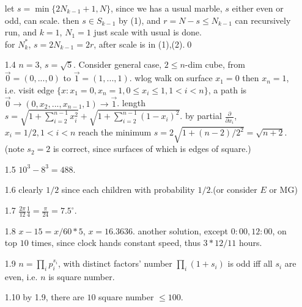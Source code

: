 \documentclass[paper=a4, fontsize=11pt]{scrartcl} %
\numberwithin{equation}{section} %
\numberwithin{figure}{section} %
\numberwithin{table}{section} %
\begin{document}
\begin{itemize}
	let $s= \min\{2N_{k-1}+1, N\}$, since we has a usual marble, $s$ either even or odd, can scale. then $s\in S_{k-1}$ by (1), and $r=N-s\leq N_{k-1}$ can recursively run, and $k=1$, $N_1=1$ just scale with usual is done.\\
	for $N_k^*$, $s=2N_{k-1}=2r$, after scale is in (1),(2).\qed
	\item[1.4] $n=3$, $s=\sqrt{5}$. Consider general case, $2\leq n$-dim cube, from $\overrightarrow{0}=(0,...,0)$ to $\overrightarrow{1}=(1,...,1)$. wlog walk on surface $x_1=0$ then $x_n=1$, i.e. visit edge $\{x:x_1=0,x_n=1, 0\leq x_i\leq 1, 1<i<n\}$, a path is $\overrightarrow{0} \rightarrow (0,x_2,...,x_{n-1},1) \rightarrow \overrightarrow{1}$. length $s=\sqrt{1+ \sum_{i=2}^{n-1}x_i^2}+\sqrt{1+ \sum_{i=2}^{n-1}(1-x_i)^2}$. by partial $\frac{\partial}{\partial x_i}$, $x_i=1/2,1<i<n$ reach the minimum $s=2\sqrt{1+ (n-2)/2^2}=\sqrt{n+2}$. (note $s_2=2$ is correct, since surfaces of which is edges of square.)
	\item[1.5] $10^3-8^3=488$.
	\item[1.6] clearly $1/2$ since each children with probability $1/2$.(or consider $E$ or MG) 
	\item[1.7] $\frac{2\pi}{12}\frac{1}{4}=\frac{\pi}{24}=7.5^\circ$.
	\item[1.8] $x-15 = x/60 *5$, $x=16.3636$. another solution, except $0:00,12:00$, on top $10$ times, since clock hands constant speed, thus $3*12/11$ hours.
	\item[1.9] $n = \prod_i p_i^{s_i}$, with distinct factors' number $\prod_i (1+s_i)$ is odd iff all $s_i$ are even, i.e. $n$ is square number. 
	\item[1.10] by 1.9, there are $10$ square number $\leq 100$.
\end{itemize}
\end{document}
